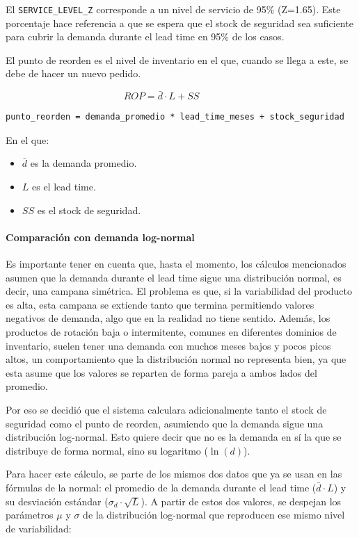 El \texttt{SERVICE\_LEVEL\_Z} corresponde a un nivel de servicio de 95\% (Z=1.65). Este porcentaje hace referencia a que se espera que el stock de seguridad sea suficiente para cubrir la demanda durante el lead time en 95\% de los casos.

El punto de reorden es el nivel de inventario en el que, cuando se llega a este, se debe de hacer un nuevo pedido.

\[
ROP = \bar{d} \cdot L + SS
\qquad\qquad
\]

\label{lst:punto_reorden}
\begin{verbatim}
punto_reorden = demanda_promedio * lead_time_meses + stock_seguridad
\end{verbatim}

En el que:
\begin{itemize}
    \item $\bar{d}$ es la demanda promedio.
    \item $L$ es el lead time.
    \item $SS$ es el stock de seguridad.
\end{itemize}

\paragraph{Comparación con demanda log-normal}

Es importante tener en cuenta que, hasta el momento, los cálculos mencionados asumen que la demanda durante el lead time sigue una distribución normal, es decir, una campana simétrica. El problema es que, si la variabilidad del producto es alta, esta campana se extiende tanto que termina permitiendo valores negativos de demanda, algo que en la realidad no tiene sentido. Además, los productos de rotación baja o intermitente, comunes en diferentes dominios de inventario, suelen tener una demanda con muchos meses bajos y pocos picos altos, un comportamiento que la distribución normal no representa bien, ya que esta asume que los valores se reparten de forma pareja a ambos lados del promedio.

Por eso se decidió que el sistema calculara adicionalmente tanto el stock de seguridad como el punto de reorden, asumiendo que la demanda sigue una distribución log-normal. Esto quiere decir que no es la demanda en sí la que se distribuye de forma normal, sino su logaritmo ($\ln(d)$).

Para hacer este cálculo, se parte de los mismos dos datos que ya se usan en las fórmulas de la normal: el promedio de la demanda durante el lead time ($\bar{d} \cdot L$) y su desviación estándar ($\sigma_d \cdot \sqrt{L}$). A partir de estos dos valores, se despejan los parámetros $\mu$ y $\sigma$ de la distribución log-normal que reproducen ese mismo nivel de variabilidad:

